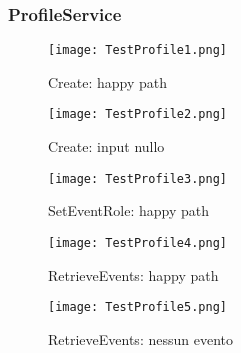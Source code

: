 \subsubsection{ProfileService}
\begin{figure}[h!]
    \begin{center}
        \texttt{[image: TestProfile1.png]}
        \caption{Create: happy path}
    \end{center}
\end{figure}
\begin{figure}[h!]
    \begin{center}
        \texttt{[image: TestProfile2.png]}
        \caption{Create: input nullo}
    \end{center}
\end{figure}
\begin{figure}[h!]
    \begin{center}
        \texttt{[image: TestProfile3.png]}
        \caption{SetEventRole: happy path}
    \end{center}
\end{figure}
\begin{figure}[h!]
    \begin{center}
        \texttt{[image: TestProfile4.png]}
        \caption{RetrieveEvents: happy path}
    \end{center}
\end{figure}
\begin{figure}[h!]
    \begin{center}
        \texttt{[image: TestProfile5.png]}
        \caption{RetrieveEvents: nessun evento}
    \end{center}
\end{figure}
\clearpage


